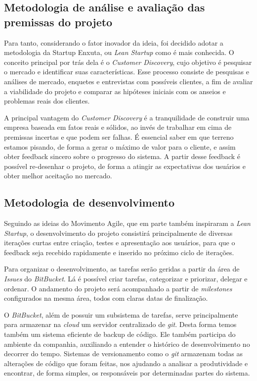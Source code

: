\documentclass[a4paper]{abntex2}
\begin{document}
\subsection{Metodologia de análise e avaliação das premissas do projeto}
Para tanto, considerando o fator inovador da ideia, foi decidido adotar a metodologia da Startup Enxuta, ou \emph{Lean Startup} como é mais conhecida. O conceito principal por trás dela é o \emph{Customer Discovery}\cite{manual-startup}, cujo objetivo é pesquisar o mercado e identificar suas características. Esse processo consiste de pesquisas e análises de mercado, enquetes e entrevistas com possíveis clientes, a fim de avaliar a viabilidade do projeto e comparar as hipóteses iniciais com os anseios e problemas reais dos clientes.

A principal vantagem do \emph{Customer Discovery} é a tranquilidade de construir uma empresa baseada em fatos reais e sólidos, ao invés de trabalhar em cima de premissas incertas e que podem ser falhas. É essencial saber em que terreno estamos pisando, de forma a gerar o máximo de valor para o cliente, e assim obter feedback sincero sobre o progresso do sistema. A partir desse feedback é possível re-desenhar o projeto, de forma a atingir as expectativas dos usuários e obter melhor aceitação no mercado.

\subsection{Metodologia de desenvolvimento}
Seguindo as ideias do Movimento Agile, que em parte também inspiraram a \emph{Lean Startup}, o desenvolvimento do projeto consistirá principalmente de diversas iterações curtas entre criação, testes e apresentação aos usuários, para que o feedback seja recebido rapidamente e inserido no próximo ciclo de iterações.

Para organizar o desenvolvimento, as tarefas serão geridas a partir da área de \emph{Issues} do \emph{BitBucket}. Lá é possível criar tarefas, categorizar e priorizar, delegar e ordenar. O andamento do projeto será acompanhado a partir de \emph{milestones} configurados na mesma área, todos com claras datas de finalização.

O \emph{BitBucket}, além de possuir um subsistema de tarefas, serve principalmente para armazenar na \emph{cloud} um servidor centralizado de \emph{git}. Desta forma temos também um sistema eficiente de backup de código. Ele também participa do ambiente da companhia, auxiliando a entender o histórico de desenvolvimento no decorrer do tempo. Sistemas de versionamento como o \emph{git} armazenam todas as alterações de código que foram feitas, nos ajudando a analisar a produtividade e encontrar, de forma simples, os responsáveis por determinadas partes do sistema.
\end{document}
